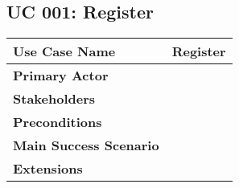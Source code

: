 \subsection{UC 001: Register}
\label{uc:001-register}

\begin{tabular}{|l|l|}
\hline
\textbf{Use Case Name} 	&	Register	\\ \hline
\textbf{Primary Actor} 	&		\\ \hline
\textbf{Stakeholders}	&		\\ \hline
\textbf{Preconditions}	&		\\ \hline
\textbf{Main Success Scenario}	& 	\\ \hline
\textbf{Extensions}	& 	\\ \hline
\end{tabular}